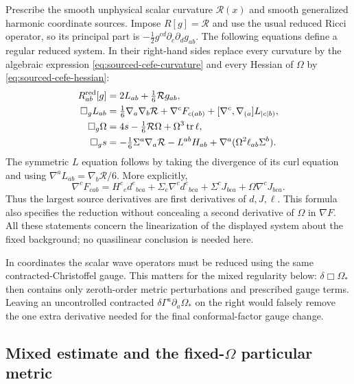 Prescribe the smooth unphysical scalar curvature $\mathcal R(x)$ and smooth
generalized harmonic coordinate sources.  Impose $R[g]=\mathcal R$ and use
the usual reduced Ricci operator, so its principal part is
$-\tfrac12g^{cd}\partial_c\partial_dg_{ab}$.
The following equations define a regular reduced system.  In their right-hand
sides replace every curvature by the algebraic expression
\eqref{eq:sourced-cefe-curvature} and every Hessian of $\Omega$ by
\eqref{eq:sourced-cefe-hessian}:
\begin{align}
 R^{\rm red}_{ab}[g]&=2L_{ab}+\tfrac16\mathcal R g_{ab},
        \label{eq:sourced-reduced-metric}\\
 \Box_g L_{ab}&=\tfrac16\nabla_a\nabla_b\mathcal R
   +\nabla^cF_{c(ab)}
   +[\nabla^c,\nabla_{(a}]L_{|c|b)},
        \label{eq:sourced-reduced-L}\\
 \Box_g\Omega&=4s-\tfrac16\mathcal R\Omega
                    +\Omega^3\operatorname{tr}\ell,
        \label{eq:sourced-reduced-Omega}\\
 \Box_gs&=-\tfrac16\Sigma^a\nabla_a\mathcal R-L^{ab}H_{ab}
              +\nabla^a(\Omega^2\ell_{ab}\Sigma^b).
        \label{eq:sourced-reduced-s}
\end{align}
The symmetric $L$ equation follows by taking the divergence of its curl
equation and using $\nabla^aL_{ab}=\nabla_b\mathcal R/6$.
More explicitly,
\[
 \nabla^cF_{cab}
 =H^c{}_e d^e{}_{bca}+\Sigma_e\nabla^cd^e{}_{bca}
    +\Sigma^cJ_{bca}+\Omega\nabla^cJ_{bca}.
\]
Thus the largest source derivatives are first derivatives of $d,J,\ell$.
This formula also specifies the reduction without concealing a second
derivative of $\Omega$ in $\nabla F$.  All these statements concern the
linearization of the displayed system about the fixed background; no
quasilinear conclusion is needed here.

In coordinates the scalar wave operators must be reduced using the same
contracted-Christoffel gauge.  This matters for the mixed regularity below:
$\delta\Box\Omega_*$ then contains only zeroth-order metric perturbations
and prescribed gauge terms.  Leaving an uncontrolled contracted
$\delta\Gamma^a\partial_a\Omega_*$ on the right would falsely remove the
one extra derivative needed for the final conformal-factor gauge change.

\subsection{Mixed estimate and the fixed-$\Omega$ particular metric}

